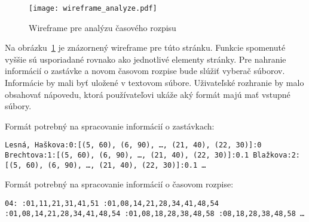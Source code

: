 \begin{figure}[h]\label{fig:wireframe_analyze}
  \centering
  \texttt{[image: wireframe\_analyze.pdf]}
  \caption{Wireframe pre analýzu časového rozpisu}
\end{figure}

Na obrázku~\ref{fig:wireframe_analyze} je znázornený wireframe pre túto stránku.
Funkcie spomenuté vyššie sú usporiadané rovnako ako jednotlivé elementy stránky.
Pre nahranie informácií o zastávke a novom časovom rozpise bude slúžiť vyberač súborov.
Informácie by mali byť uložené v textovom súbore.
Uživateľské rozhranie by malo obsahovať nápovedu, ktorá používateľovi ukáže aký formát majú mať vstupné súbory.

\noindent Formát potrebný na spracovanie informácií o zastávkach:

\noindent \texttt{Lesná, Haškova:0:[(5, 60), (6, 90), \ldots , (21, 40), (22, 30)]:0 \newline
  Brechtova:1:[(5, 60), (6, 90), \ldots , (21, 40), (22, 30)]:0.1 \newline
  Blažkova:2:[(5, 60), (6, 90), \ldots , (21, 40), (22, 30)]:0.1 \newline
  \ldots
}

\noindent Formát potrebný na spracovanie informácií o časovom rozpise:

\noindent \texttt{04: :01,11,21,31,41,51 :01,08,14,21,28,34,41,48,54 :01,08,14,21,28,34,41,48,54 :01,08,18,28,38,48,58 :08,18,28,38,48,58 \newline
  \ldots
}

